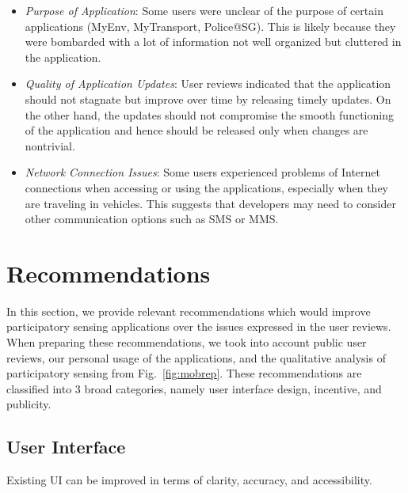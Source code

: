 \documentclass[conference,10pt]{IEEEtran}
\begin{document}
\begin{itemize}[leftmargin=1.5em]
\item {\it Purpose of Application}: Some users were unclear of the purpose of certain applications (MyEnv, MyTransport, Police@SG). This is likely because they were bombarded with a lot of information not well organized but cluttered in the application.
\item {\it Quality of Application Updates}: User reviews indicated that the application should not stagnate but improve over time by releasing timely updates. On the other hand, the updates should not compromise the smooth functioning of the application and hence should be released only when changes are nontrivial.
\item {\it Network Connection Issues}: Some users experienced problems of Internet connections when accessing or using the applications, especially when they are traveling in vehicles. This suggests that developers may need to consider other communication options such as SMS or MMS.
\end{itemize}


\section{Recommendations}\label{sec:rec}

In this section, we provide relevant recommendations which would improve participatory sensing applications over the issues expressed in the user reviews. When preparing these recommendations, we took into account public user reviews, our personal usage of the applications, and the qualitative analysis of participatory sensing from Fig.~\ref{fig:mobrep}. These recommendations are classified into 3 broad categories, namely user interface design, incentive, and publicity.

\subsection{User Interface}

Existing UI can be improved in terms of clarity, accuracy, and accessibility.
\end{document}
